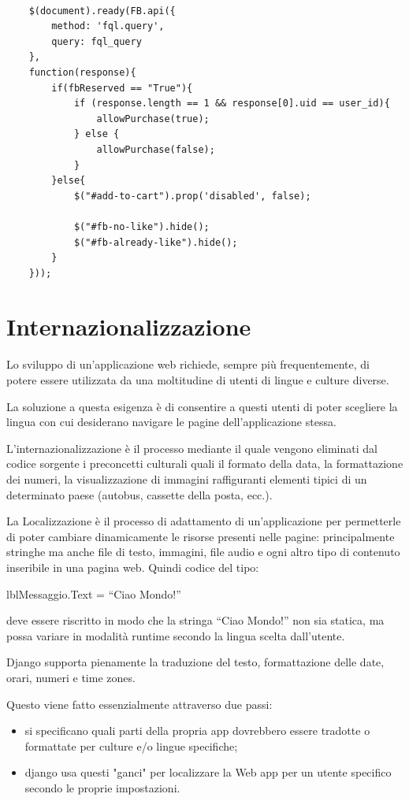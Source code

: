 \begin{lstlisting}

    $(document).ready(FB.api({
        method: 'fql.query',
        query: fql_query
    },
    function(response){
        if(fbReserved == "True"){
            if (response.length == 1 && response[0].uid == user_id){
                allowPurchase(true);
            } else {
                allowPurchase(false);
            }
        }else{
            $("#add-to-cart").prop('disabled', false);

            $("#fb-no-like").hide();
            $("#fb-already-like").hide();
        }
    }));

\end{lstlisting}

\section{Internazionalizzazione}
Lo sviluppo di un’applicazione web richiede, sempre più frequentemente, di potere essere utilizzata da una moltitudine di utenti di lingue e culture diverse.

La soluzione a questa esigenza è di consentire a questi utenti di poter scegliere la lingua con cui desiderano navigare le pagine dell’applicazione stessa.

L'internazionalizzazione è il processo mediante il quale vengono eliminati dal codice sorgente i preconcetti culturali quali il formato della data, la formattazione dei numeri, la visualizzazione di immagini raffiguranti elementi tipici di un determinato paese (autobus, cassette della posta, ecc.). 

La Localizzazione è il processo di adattamento di un’applicazione per permetterle di poter cambiare dinamicamente le risorse presenti nelle pagine: principalmente stringhe ma anche file di testo, immagini, file audio e ogni altro tipo di contenuto inseribile in una pagina web.
Quindi codice del tipo:

lblMessaggio.Text = “Ciao Mondo!”

deve essere riscritto in modo che la stringa “Ciao Mondo!” non sia statica, ma possa variare in modalità runtime secondo la lingua scelta dall’utente.

Django supporta pienamente la traduzione del testo, formattazione delle date, orari, numeri e  time zones.

Questo viene fatto essenzialmente attraverso due passi:
\begin{itemize}
	\item si specificano quali parti della propria app dovrebbero essere tradotte o formattate per culture e/o lingue specifiche;
	\item django usa questi "ganci" per localizzare la Web app per un utente specifico secondo le proprie impostazioni.
\end{itemize}

